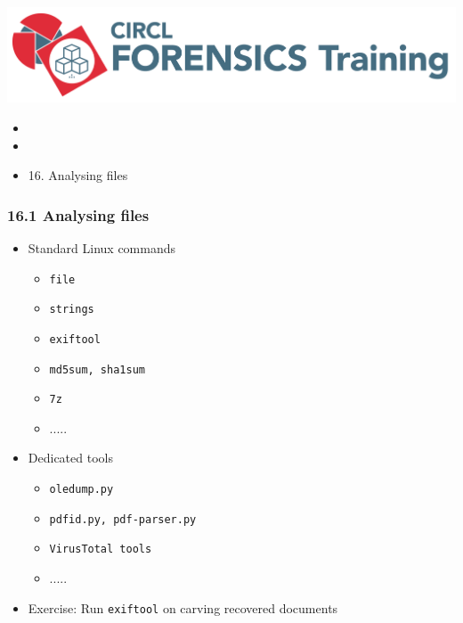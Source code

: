 

\begin{frame}
    \includegraphics[scale=0.3]{images/logo-circl-Forensics.png}
    \begin{itemize}
        \item[]
        \item[]
        \item[] 16. Analysing files
    \end{itemize}
\end{frame}


\begin{frame}[fragile]
  \frametitle{16.1 Analysing files}
    \begin{itemize}
       \item Standard Linux commands
            \begin{itemize}
                \item[] \texttt{file}
                \item[] \texttt{strings}
                \item[] \texttt{exiftool}
                \item[] \texttt{md5sum, sha1sum}
                \item[] \texttt{7z}
                \item[] .....
            \end{itemize}
       \item Dedicated tools
            \begin{itemize}
                \item[] \texttt{oledump.py}
                \item[] \texttt{pdfid.py, pdf-parser.py}
                \item[] \texttt{VirusTotal tools}
                \item[] .....
            \end{itemize}
       \item Exercise: Run \texttt{exiftool} on carving recovered documents
    \end{itemize}
\end{frame}


